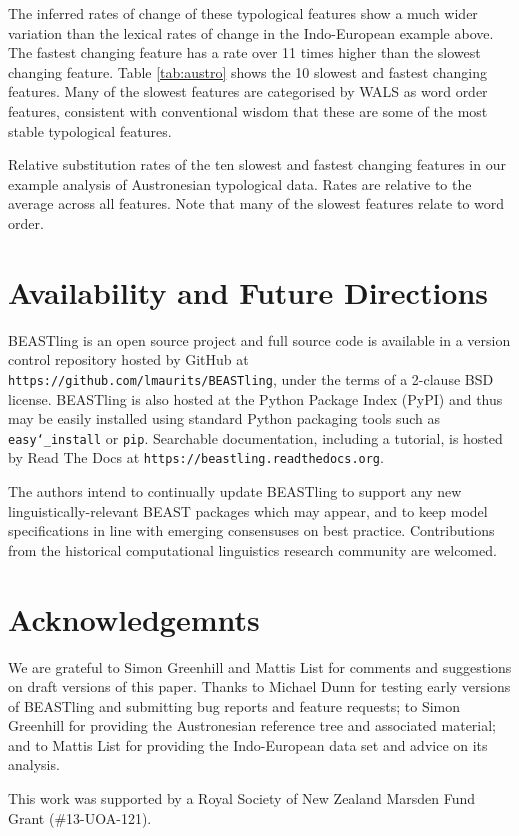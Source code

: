 \documentclass[twocolumn,10pt]{scrartcl}
\begin{document}
The inferred rates of change of these typological features show a much wider variation than the lexical rates of change in the Indo-European example above.  The fastest changing feature has a rate over 11 times higher than the slowest changing feature.  Table \ref{tab:austro} shows the 10 slowest and fastest changing features.  Many of the slowest features are categorised by WALS as word order features, consistent with conventional wisdom that these are some of the most stable typological features.

\begin{table*}[ht]
	\begin{center}
		
	\end{center}
	\caption{Relative substitution rates of the ten slowest and fastest changing features in our example analysis of Austronesian typological data.  Rates are relative to the average across all features.  Note that many of the slowest features relate to word order.}
\label{tab:austro}
\end{table*}

\section{Availability and Future Directions}

BEASTling is an open source project and full source code is available in a version control repository hosted by GitHub at \texttt{https://github.com/lmaurits/BEASTling}, under the terms of a 2-clause BSD license.  BEASTling is also hosted at the Python Package Index (PyPI) and thus may be easily installed using standard Python packaging tools such as \texttt{easy\char`_install} or \texttt{pip}.  Searchable documentation, including a tutorial, is hosted by Read The Docs at \texttt{https://beastling.readthedocs.org}.

The authors intend to continually update BEASTling to support any new linguistically-relevant BEAST packages which may appear, and to keep model specifications in line with emerging consensuses on best practice.  Contributions from the historical computational linguistics research community are welcomed.

\section{Acknowledgemnts}

We are grateful to Simon Greenhill and Mattis List for comments and suggestions on draft versions of this paper.  Thanks to Michael Dunn for testing early versions of BEASTling and submitting bug reports and feature requests; to Simon Greenhill for providing the Austronesian reference tree and associated material; and to Mattis List for providing the Indo-European data set and advice on its analysis.

This work was supported by a Royal Society of New Zealand Marsden Fund Grant (\#13-UOA-121).




\end{document}
